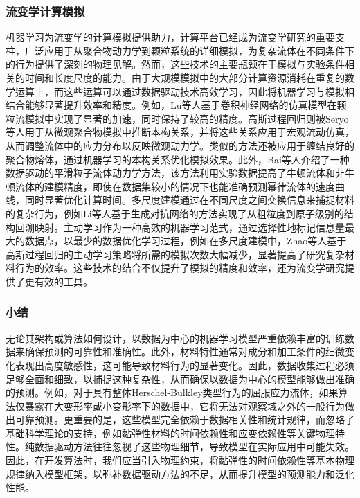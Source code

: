 \subsubsection{流变学计算模拟}
机器学习为流变学的计算模拟提供助力，计算平台已经成为流变学研究的重要支柱，广泛应用于从聚合物动力学到颗粒系统的详细模拟，为复杂流体在不同条件下的行为提供了深刻的物理见解。然而，这些技术的主要瓶颈在于模拟与实验条件相关的时间和长度尺度的能力。由于大规模模拟中的大部分计算资源消耗在重复的数学运算上，而这些运算可以通过数据驱动技术高效学习，因此将机器学习与模拟相结合能够显著提升效率和精度。例如，Lu等人基于卷积神经网络的仿真模型在颗粒流模拟中实现了显著的加速，同时保持了较高的精度\cite{lu2021machine}。高斯过程回归则被Seryo等人用于从微观聚合物模拟中推断本构关系，并将这些关系应用于宏观流动仿真，从而调整流体中的应力分布以反映微观动力学\cite{seryoLearningConstitutiveRelation2020}。类似的方法还被应用于缠结良好的聚合物熔体，通过机器学习的本构关系优化模拟效果。此外，Bai等人介绍了一种数据驱动的平滑粒子流体动力学方法，该方法利用实验数据提高了牛顿流体和非牛顿流体的建模精度，即使在数据集较小的情况下也能准确预测幂律流体的速度曲线，同时显著优化计算时间\cite{baiDatadrivenSmoothedParticle2021}。多尺度建模通过在不同尺度之间交换信息来捕捉材料的复杂行为，例如Li等人基于生成对抗网络的方法实现了从粗粒度到原子级别的结构回溯映射\cite{liBackmappingCoarsegrainedMacromolecules2020}。主动学习作为一种高效的机器学习范式，通过选择性地标记信息量最大的数据点，以最少的数据优化学习过程，例如在多尺度建模中，Zhao等人基于高斯过程回归的主动学习策略将所需的模拟次数大幅减少，显著提高了研究复杂材料行为的效率\cite{zhaoActiveLearningConstitutive2018}。这些技术的结合不仅提升了模拟的精度和效率，还为流变学研究提供了更有效的工具。

\subsubsection{小结}
无论其架构或算法如何设计，以数据为中心的机器学习模型严重依赖丰富的训练数据来确保预测的可靠性和准确性。此外，材料特性通常对成分和加工条件的细微变化表现出高度敏感性，这可能导致材料行为的显著变化。因此，数据收集过程必须足够全面和细致，以捕捉这种复杂性，从而确保以数据为中心的模型能够做出准确的预测。例如，对于具有整体Herschel-Bulkley类型行为的屈服应力流体，如果算法仅暴露在大变形率或小变形率下的数据中，它将无法对观察域之外的一般行为做出可靠预测\cite{mangalDatadrivenTechniquesRheology2025,saadatRheologistsGuidelineDatadriven2023,reyesLearningUnknownPhysics2021}。更重要的是，这些模型完全依赖于数据相关性和统计规律，而忽略了基础科学理论的支持，例如黏弹性材料的时间依赖性和应变依赖性等关键物理特性。纯数据驱动方法往往忽视了这些物理细节，导致模型在实际应用中可能失效。因此，在开发算法时，我们应当引入物理约束，将黏弹性的时间依赖性等基本物理规律纳入模型框架，以弥补数据驱动方法的不足，从而提升模型的预测能力和泛化性能。
